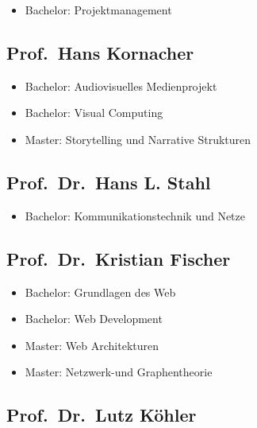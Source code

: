 \begin{itemize}
\tightlist
\item
  Bachelor: Projektmanagement
\end{itemize}

\subsection{Prof.~Hans
Kornacher\label{/mi-2017/selbstbericht/0800-ausstattung/0000-ausstattung}}\label{prof.hans-kornacherpathlabelmi-2017selbstbericht0800-ausstattung0000-ausstattung}

\begin{itemize}
\tightlist
\item
  Bachelor: Audiovisuelles Medienprojekt
\item
  Bachelor: Visual Computing
\item
  Master: Storytelling und Narrative Strukturen
\end{itemize}

\subsection{Prof.~Dr.~Hans L.
Stahl\label{/mi-2017/selbstbericht/0800-ausstattung/0000-ausstattung}}\label{prof.dr.hans-l.-stahlpathlabelmi-2017selbstbericht0800-ausstattung0000-ausstattung}

\begin{itemize}
\tightlist
\item
  Bachelor: Kommunikationstechnik und Netze
\end{itemize}

\subsection{Prof.~Dr.~Kristian
Fischer\label{/mi-2017/selbstbericht/0800-ausstattung/0000-ausstattung}}\label{prof.dr.kristian-fischerpathlabelmi-2017selbstbericht0800-ausstattung0000-ausstattung}

\begin{itemize}
\tightlist
\item
  Bachelor: Grundlagen des Web
\item
  Bachelor: Web Development
\item
  Master: Web Architekturen
\item
  Master: Netzwerk-und Graphentheorie
\end{itemize}

\subsection{Prof.~Dr.~Lutz
Köhler\label{/mi-2017/selbstbericht/0800-ausstattung/0000-ausstattung}}\label{prof.dr.lutz-kuxf6hlerpathlabelmi-2017selbstbericht0800-ausstattung0000-ausstattung}

